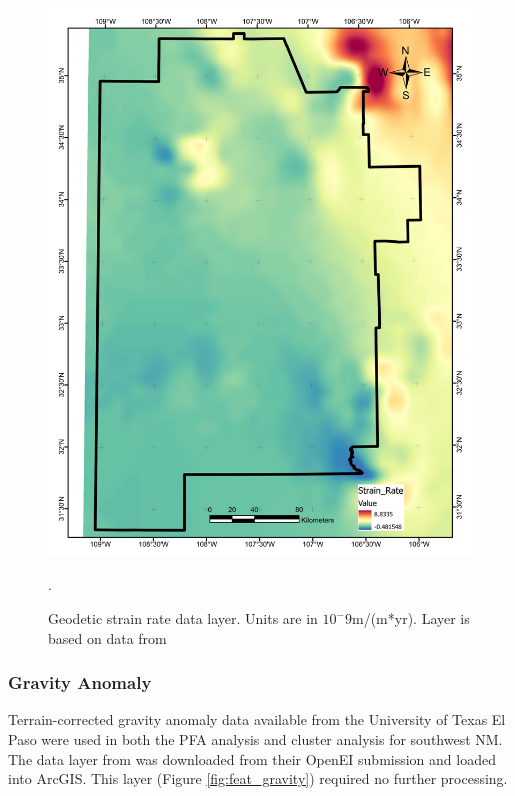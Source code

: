 \begin{figure}[!htp]
\centering
\includegraphics[scale=.50]{templates/images/Figure-StrainRate.pdf}
\caption[Geodetic strain rate data layer]{Geodetic strain rate data layer. Units are in $10^-9$m/(m*yr). Layer is based on data from \protect\citep{kreemer_geodetic_2014}}.
\label{fig:feat_strain}
\end{figure}

\subsubsection{Gravity Anomaly}

Terrain-corrected gravity anomaly data available from the University of Texas El Paso \citep{utep_gravity_2011} were used in both the PFA analysis \citep{bielicki_hydrogeolgic_2015} and cluster analysis \citep{pepin_new_2018} for southwest NM. The data layer from \citet{bielicki_hydrogeolgic_2015} was downloaded from their OpenEI submission \citep{kelley_geothermal_2015} and loaded into ArcGIS. This layer (Figure \ref{fig:feat_gravity}) required no further processing.

